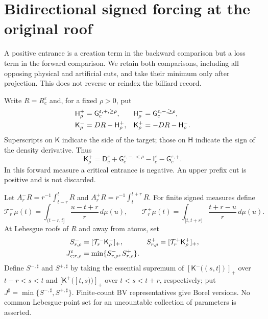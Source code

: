 \section{Bidirectional signed forcing at the original roof}
\label{sec:v95-bidirectional}
A positive entrance is a creation term in the backward comparison but
a loss term in the forward comparison. We retain both comparisons,
including all opposing physical and artificial cuts, and take their
minimum only after projection. This does not reverse or reindex the
billiard record.

Write $R=R_c^\varepsilon$ and, for a fixed $\rho>0$, put
\begin{align}
 \mathsf H_\rho^+&=\mathsf G_c^{\varepsilon,+,\ge\rho},
 &\mathsf H_\rho^-&=\mathsf G_c^{\varepsilon,-,\ge\rho},\notag\\
 \mathsf K_\rho^-&=DR-\mathsf H_\rho^+,
 &\mathsf K_\rho^+&=-DR-\mathsf H_\rho^-.
 \label{eq:v95-two-measures}
\end{align}
Superscripts on $\mathsf K$ indicate the side of the target; those
on $\mathsf H$ indicate the sign of the density derivative. Thus
\[
 \mathsf K_\rho^+=\mathsf D_c^\varepsilon
 +\mathsf G_c^{\varepsilon,-,<\rho}
 -\mathsf I_c^\varepsilon-\mathsf G_c^{\varepsilon,+}.
\]
In this forward measure a critical entrance is negative. An upper
prefix cut is positive and is not discarded.

Let $A_r^-R=r^{-1}\int_{t-r}^tR$ and
$A_r^+R=r^{-1}\int_t^{t+r}R$. For finite signed measures define
\[
 \mathcal T_r^-\mu(t)=\int_{(t-r,t]}\frac{u-t+r}{r}\,d\mu(u),
 \qquad
 \mathcal T_r^+\mu(t)=\int_{[t,t+r)}\frac{t+r-u}{r}\,d\mu(u).
\]
At Lebesgue roofs of $R$ and away from atoms, set
\begin{align}
 S_{r,\rho}^-&=[\mathcal T_r^-\mathsf K_\rho^-]_+,
 &S_{r,\rho}^+&=[\mathcal T_r^+\mathsf K_\rho^+]_+,\notag\\
 J_{c;r,\rho}^\varepsilon&=\min\{S_{r,\rho}^-,S_{r,\rho}^+\}.
 \label{eq:v95-joint-forcing}
\end{align}
Define $S^{-,\sharp}$ and $S^{+,\sharp}$ by taking the essential
supremum of $[\mathsf K^-((s,t])]_+$ over $t-r<s<t$ and
$[\mathsf K^+([t,s))]_+$ over $t<s<t+r$, respectively; put
$J^\sharp=\min\{S^{-,\sharp},S^{+,\sharp}\}$. Finite-count BV
representatives give Borel versions. No common Lebesgue-point set
for an uncountable collection of parameters is asserted.

